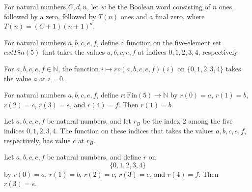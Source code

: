 \begin{definition}
\label{Complexity.UTab.Front.word}
\leanok
{}
For natural numbers $C,d,n$, let $w$ be the Boolean word consisting of $n$ ones,
followed by a zero, followed by $T(n)$ ones and a final zero, where $T(n)=(C+1)(n+1)^d$.
\end{definition}

\begin{definition}
\label{Complexity.UTab.Front.rv}
\leanok
For natural numbers $a,b,c,e,f$, define a function on the five-element set
$	ext{Fin}(5)$ that takes the values $a,b,c,e,f$ at indices $0,1,2,3,4$, respectively.
\end{definition}

\begin{lemma}
\label{Complexity.UTab.Front.rv_X}
\leanok
{}
For $a,b,c,e,f\in\mathbb N$, the function $i\mapsto rv(a,b,c,e,f)(i)$ on $\{0,1,2,3,4\}$
takes the value $a$ at $i=0$.
\end{lemma}

\begin{lemma}
\label{Complexity.UTab.Front.rv_A}
\leanok
{}
For natural numbers $a,b,c,e,f$, define $r:\text{Fin}(5)\to\mathbb{N}$ by $r(0)=a$, $r(1)=b$,
$r(2)=c$, $r(3)=e$, and $r(4)=f$. Then $r(1)=b$.
\end{lemma}

\begin{lemma}
\label{Complexity.UTab.Front.rv_B}
\leanok
{}
Let $a,b,c,e,f$ be natural numbers, and let $r_B$ be the index $2$ among the five
indices $0,1,2,3,4$. The function on these indices that takes the values $a,b,c,e,f$,
respectively, has value $c$ at $r_B$.
\end{lemma}

\begin{lemma}
\label{Complexity.UTab.Front.rv_Tm}
\leanok
{}
Let $a,b,c,e,f$ be natural numbers, and define $r$ on $$\{0,1,2,3,4\}$$ by $r(0)=a$,
$r(1)=b$, $r(2)=c$, $r(3)=e$, and $r(4)=f$. Then $r(3)=e$.
\end{lemma}

